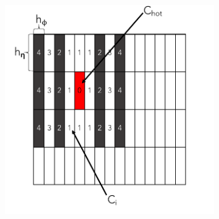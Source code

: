 \begin{figure}[!ht]
  \begin{center}
  \begin{subfigure}[c]{.48\textwidth}
  \centering
  \includegraphics[width=\textwidth]{sections/ringer/figures/reco_steps/ring_em1_mask.pdf}
  \caption{}
  \label{fig:building_rings_a}
  \end{subfigure}\\
  \centering
  

\end{center}
\end{figure}
